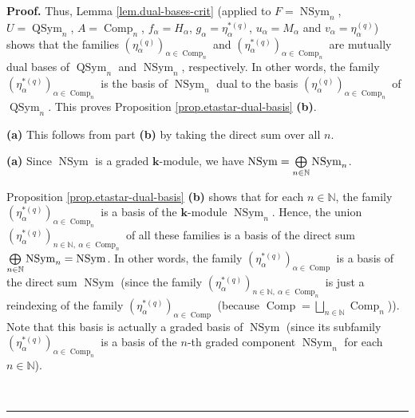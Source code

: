 \documentclass[numbers=enddot,12pt,final,onecolumn,notitlepage]{scrartcl}%
\theoremstyle{definition}
\newenvironment{proof}[1][Proof]{\noindent\textbf{#1.} }{\ \rule{0.5em}{0.5em}}
\let\oplusnonlimits\bigoplus
\renewcommand{\bigoplus}{\oplusnonlimits\limits}
\newenvironment{verlong}{}{}
\newenvironment{vershort}{}{}
\begin{document}
\begin{proof}
Thus, Lemma \ref{lem.dual-bases-crit} (applied to $F=\operatorname*{NSym}%
\nolimits_{n}$, $U=\operatorname*{QSym}\nolimits_{n}$, $A=\operatorname*{Comp}%
\nolimits_{n}$, $f_{\alpha}=H_{\alpha}$, $g_{\alpha}=\eta_{\alpha}%
^{\ast\left(  q\right)  }$, $u_{\alpha}=M_{\alpha}$ and $v_{\alpha}%
=\eta_{\alpha}^{\left(  q\right)  }$) shows that the families $\left(
\eta_{\alpha}^{\left(  q\right)  }\right)  _{\alpha\in\operatorname*{Comp}%
\nolimits_{n}}$ and $\left(  \eta_{\alpha}^{\ast\left(  q\right)  }\right)
_{\alpha\in\operatorname*{Comp}\nolimits_{n}}$ are mutually dual bases of
$\operatorname*{QSym}\nolimits_{n}$ and $\operatorname*{NSym}\nolimits_{n}$,
respectively. In other words, the family $\left(  \eta_{\alpha}^{\ast\left(
q\right)  }\right)  _{\alpha\in\operatorname*{Comp}\nolimits_{n}}$ is the
basis of $\operatorname*{NSym}\nolimits_{n}$ dual to the basis $\left(
\eta_{\alpha}^{\left(  q\right)  }\right)  _{\alpha\in\operatorname*{Comp}%
\nolimits_{n}}$ of $\operatorname*{QSym}\nolimits_{n}$. This proves
Proposition \ref{prop.etastar-dual-basis} \textbf{(b)}. \medskip

\begin{vershort}
\textbf{(a)} This follows from part \textbf{(b)} by taking the direct sum over
all $n$. \qedhere

\end{vershort}

\begin{verlong}
\textbf{(a)} Since $\operatorname*{NSym}$ is a graded $\mathbf{k}$-module, we
have $\operatorname*{NSym}=\bigoplus\limits_{n\in\mathbb{N}}%
\operatorname*{NSym}\nolimits_{n}$.

Proposition \ref{prop.etastar-dual-basis} \textbf{(b)} shows that for each
$n\in\mathbb{N}$, the family $\left(  \eta_{\alpha}^{\ast\left(  q\right)
}\right)  _{\alpha\in\operatorname*{Comp}\nolimits_{n}}$ is a basis of the
$\mathbf{k}$-module $\operatorname*{NSym}\nolimits_{n}$. Hence, the union
$\left(  \eta_{\alpha}^{\ast\left(  q\right)  }\right)  _{n\in\mathbb{N}%
,\ \alpha\in\operatorname*{Comp}\nolimits_{n}}$ of all these families is a
basis of the direct sum $\bigoplus\limits_{n\in\mathbb{N}}\operatorname*{NSym}%
\nolimits_{n}=\operatorname*{NSym}$. In other words, the family $\left(
\eta_{\alpha}^{\ast\left(  q\right)  }\right)  _{\alpha\in\operatorname*{Comp}%
}$ is a basis of the direct sum $\operatorname*{NSym}$ (since the family
$\left(  \eta_{\alpha}^{\ast\left(  q\right)  }\right)  _{n\in\mathbb{N}%
,\ \alpha\in\operatorname*{Comp}\nolimits_{n}}$ is just a reindexing of the
family $\left(  \eta_{\alpha}^{\ast\left(  q\right)  }\right)  _{\alpha
\in\operatorname*{Comp}}$ (because $\operatorname*{Comp}=\bigsqcup
\limits_{n\in\mathbb{N}}\operatorname*{Comp}\nolimits_{n}$)). Note that this
basis is actually a graded basis of $\operatorname*{NSym}$ (since its
subfamily $\left(  \eta_{\alpha}^{\ast\left(  q\right)  }\right)  _{\alpha
\in\operatorname*{Comp}\nolimits_{n}}$ is a basis of the $n$-th graded
component $\operatorname*{NSym}\nolimits_{n}$ for each $n\in\mathbb{N}$).


\end{verlong}
\end{proof}
\end{document}

